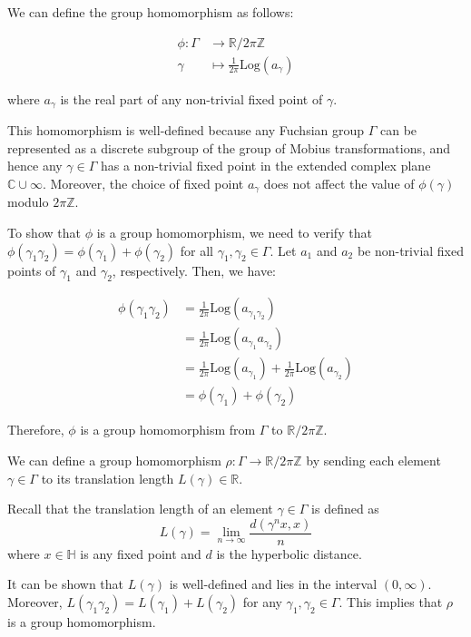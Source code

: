 \documentclass[12pt,a4paper,english]{article}
\theoremstyle{plain}
\theoremstyle{definition}
\theoremstyle{remark}
\begin{document}
We can define the group homomorphism as follows:

\begin{align*} \phi: \Gamma &\rightarrow \mathbb{R}/2\pi\mathbb{Z} \\
\gamma &\mapsto \frac{1}{2\pi}\text{Log}(a_\gamma) 
\end{align*}

where $a_\gamma$ is the real part of any non-trivial fixed point of $\gamma$.

This homomorphism is well-defined because any Fuchsian group $\Gamma$ can be represented as a discrete subgroup of the group of Mobius transformations, and hence any $\gamma \in \Gamma$ has a non-trivial fixed point in the extended complex plane $\mathbb{C}\cup{\infty}$. Moreover, the choice of fixed point $a_\gamma$ does not affect the value of $\phi(\gamma)$ modulo $2\pi\mathbb{Z}$.

To show that $\phi$ is a group homomorphism, we need to verify that $\phi(\gamma_1\gamma_2) = \phi(\gamma_1) + \phi(\gamma_2)$ for all $\gamma_1,\gamma_2 \in \Gamma$. Let $a_1$ and $a_2$ be non-trivial fixed points of $\gamma_1$ and $\gamma_2$, respectively. Then, we have:

\begin{align*} \phi(\gamma_1\gamma_2) &= \frac{1}{2\pi}\text{Log}(a_{\gamma_1\gamma_2}) \\
&= \frac{1}{2\pi}\text{Log}(a_{\gamma_1}a_{\gamma_2}) \\
&= \frac{1}{2\pi}\text{Log}(a_{\gamma_1}) + \frac{1}{2\pi}\text{Log}(a_{\gamma_2}) \\
&= \phi(\gamma_1) + \phi(\gamma_2) 
\end{align*}

Therefore, $\phi$ is a group homomorphism from $\Gamma$ to $\mathbb{R}/2\pi\mathbb{Z}$.



We can define a group homomorphism $\rho: \Gamma \to \mathbb{R}/2\pi\mathbb{Z}$ by sending each element $\gamma \in \Gamma$ to its translation length $L(\gamma) \in \mathbb{R}$.

Recall that the translation length of an element $\gamma \in \Gamma$ is defined as 
$$L(\gamma) = \lim_{n \to \infty} \frac{d(\gamma^n x, x)}{n}$$
where $x \in \mathbb{H}$ is any fixed point and $d$ is the hyperbolic distance.

It can be shown that $L(\gamma)$ is well-defined and lies in the interval $(0,\infty)$. Moreover, $L(\gamma_1\gamma_2) = L(\gamma_1) + L(\gamma_2)$ for any $\gamma_1, \gamma_2 \in \Gamma$. This implies that $\rho$ is a group homomorphism.
\end{document}
